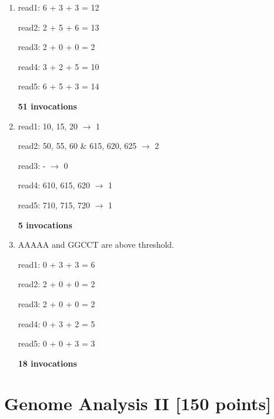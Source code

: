 \documentclass[a4paper]{article}
\begin{document}
\begin{enumerate}[label=\alph*)]
    \item read1: 6 + 3 + 3 = 12

          read2: 2 + 5 + 6 = 13

          read3: 2 + 0 + 0 = 2

          read4: 3 + 2 + 5 = 10

          read5: 6 + 5 + 3 = 14

          \textbf{51 invocations}

      \item read1: 10, 15, 20 $\rightarrow$ 1

            read2: 50, 55, 60 \& 615, 620, 625 $\rightarrow$ 2

            read3: - $\rightarrow$ 0

            read4: 610, 615, 620 $\rightarrow$ 1

            read5: 710, 715, 720 $\rightarrow$ 1

            \textbf{5 invocations}

    \item AAAAA and GGCCT are above threshold.

          read1: 0 + 3 + 3 = 6

          read2: 2 + 0 + 0 = 2

          read3: 2 + 0 + 0 = 2

          read4: 0 + 3 + 2 = 5

          read5: 0 + 0 + 3 = 3

          \textbf{18 invocations}
\end{enumerate}

\section{Genome Analysis II [150 points]}
\end{document}
